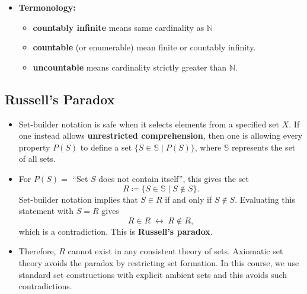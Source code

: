 \documentclass[11pt,twoside]{report}
\newcommand{\bbN}{{\mathbb{N}}}
\begin{document}
\begin{itemize}
\item \textbf{Termonology:} 
\begin{itemize}
\item   \textbf{countably infinite}  means same cardinality as $\bbN$
\item \textbf{countable} (or enumerable) mean finite or countably infinity. 

\item \textbf{uncountable} means cardinality strictly greater than $\bbN$. 
%
     \end{itemize} 
\end{itemize}


\subsection{Russell's Paradox}
\begin{itemize}
\item Set-builder notation is safe when it selects elements from a specified set $X$.  If one instead allows \textbf{unrestricted comprehension}, then one is allowing every property $P(S)$ to define a set $\{S \in \mathbb{S} \mid P(S)\}$, where $\mathbb{S}$ represents the set of all sets.

\item For $P(S) =$ ``Set $S$ does not contain itself'', this gives the set
\[
R \coloneqq \{S \in \mathbb{S} \mid S \notin S\}.
\]
Set-builder notation implies that $S\in R$ if and only if $S \notin S$.
Evaluating this statement with $S=R$ gives
\[
R \in R \;\leftrightarrow\; R \notin R,
\]
which is a contradiction.  This is \textbf{Russell's paradox}.

\item Therefore, $R$ cannot exist in any consistent theory of sets.  Axiomatic set theory avoids the paradox by restricting set formation. In this course, we use standard set constructions with explicit ambient sets and this avoids such contradictions.
\end{itemize}
\end{document}
